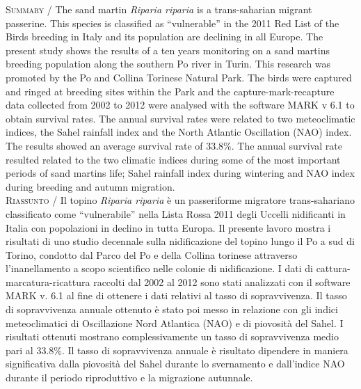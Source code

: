 {\small
\noindent \textsc{\color{MUSEBLUE} Summary} / The sand martin \textit{Riparia riparia} is a trans-saharian migrant
passerine. This species is classified as
{\textquotedblleft}vulnerable{\textquotedblright} in the 2011 Red List
of the Birds breeding in Italy and its population are declining in all
Europe. The present study shows the results of a ten years monitoring
on a sand martins breeding population along the southern Po river in
Turin. This research was promoted by the Po and Collina Torinese
Natural Park. The birds were captured and ringed at breeding sites
within the Park and the capture-mark-recapture data collected from 2002
to 2012 were analysed with the software MARK v 6.1 to obtain survival
rates. The annual survival rates were related to two meteoclimatic
indices, the Sahel rainfall index and the North Atlantic Oscillation
(NAO) index. The results showed an average survival rate of 33.8\%. The
annual survival rate resulted related to the two climatic indices
during some of the most important periods of sand martins life; Sahel
rainfall index during wintering and NAO index during breeding and
autumn migration. \\
\noindent \textsc{\color{MUSEBLUE} Riassunto} / Il topino \textit{Riparia riparia} \`e un passeriforme migratore
trans-sahariano classificato come
{\textquotedblleft}vulnerabile{\textquotedblright} nella Lista Rossa
2011 degli Uccelli nidificanti in Italia con popolazioni in declino in
tutta Europa. Il presente lavoro mostra i risultati di uno studio
decennale sulla nidificazione del topino lungo il Po a sud di Torino,
condotto dal Parco del Po e della Collina torinese attraverso
l{\textquoteright}inanellamento a scopo scientifico nelle colonie di
nidificazione. I dati di cattura-marcatura-ricattura raccolti dal 2002
al 2012 sono stati analizzati con il software MARK v. 6.1 al fine di
ottenere i dati relativi al tasso di sopravvivenza. Il tasso di
sopravvivenza annuale ottenuto \`e stato poi messo in relazione con gli
indici meteoclimatici di Oscillazione Nord Atlantica (NAO) e di
piovosit\`a del Sahel. I risultati ottenuti mostrano complessivamente
un tasso di sopravvivenza medio pari al 33.8\%. Il tasso di
sopravvivenza annuale \`e risultato dipendere in maniera significativa
dalla piovosit\`a del Sahel durante lo svernamento e
dall{\textquoteright}indice NAO durante il periodo riproduttivo e la
migrazione autunnale. 
}


